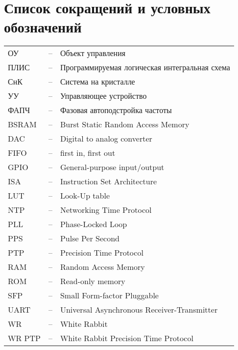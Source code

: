 \chapter*{Список сокращений и условных обозначений}             %
\noindent
\addtocounter{table}{-1}%

\noindent
\begin{tabular}{lcl}
ОУ & -- & Объект управления\\
ПЛИС & -- & Программируемая логическая интегральная схема\\
СнК & -- & Система на кристалле\\
УУ & -- & Управляющее устройство\\
ФАПЧ & -- & Фазовая автоподстройка частоты\\
BSRAM & -- & Burst Static Random Access Memory\\
DAC & -- & Digital to analog converter\\
FIFO & -- & first in, first out\\
GPIO & -- & General-purpose input/output\\
ISA & -- & Instruction Set Architecture\\
LUT & -- & Look-Up table\\
NTP & -- & Networking Time Protocol\\
PLL & -- & Phase-Locked Loop\\
PPS & -- & Pulse Per Second\\
PTP & -- & Precision Time Protocol\\
RAM & -- & Random Access Memory\\
ROM & -- & Read-only memory\\
SFP & -- & Small Form-factor Pluggable\\
UART & -- & Universal Asynchronous Receiver-Transmitter\\
WR & -- & White Rabbit\\
WR PTP & -- & White Rabbit Precision Time Protocol\\
\end{tabular}